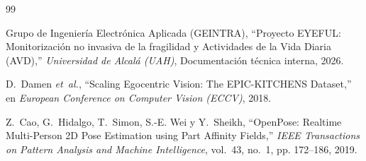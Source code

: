 \documentclass[11pt,a4paper,oneside]{article}
\begin{document}
		
		\cleardoublepage
		
		\begin{thebibliography}{99}
			
			{Grupo de Ingeniería Electrónica Aplicada (GEINTRA)}, 
			``Proyecto EYEFUL: Monitorización no invasiva de la fragilidad y Actividades de la Vida Diaria (AVD),'' 
			\emph{Universidad de Alcalá (UAH)}, Documentación técnica interna, 2026.
			
			D.~Damen \emph{et~al.}, 
			``Scaling Egocentric Vision: The EPIC-KITCHENS Dataset,'' 
			en \emph{European Conference on Computer Vision (ECCV)}, 2018.
			
			Z.~Cao, G.~Hidalgo, T.~Simon, S.-E. Wei y Y.~Sheikh, 
			``OpenPose: Realtime Multi-Person 2D Pose Estimation using Part Affinity Fields,'' 
			\emph{IEEE Transactions on Pattern Analysis and Machine Intelligence}, vol.~43, no.~1, pp. 172--186, 2019.
			
		\end{thebibliography}
		
	
\end{document}
